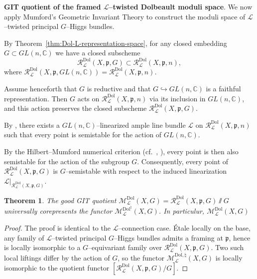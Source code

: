 \documentclass[12pt,reqno]{amsart}
\numberwithin{equation}{subsection}
\newtheorem{thm}[equation]{Theorem}
\theoremstyle{definition}
\theoremstyle{theorem}
\begin{document}
\medskip
\noindent \textbf{GIT quotient of the framed $\mathcal{L}$--twisted Dolbeault moduli space}.
We now apply Mumford's Geometric Invariant Theory to construct the
moduli space of $\mathcal{L}$--twisted principal $G$--Higgs bundles.

By Theorem~\ref{thm:Dol-L-representation-space}, for any closed embedding
$G \subset GL(n,\mathbb{C})$ we have a closed subscheme
\[
\mathcal{R}^{\mathrm{Dol}}_{\mathcal{L}}(X,\mathfrak{p},G)
\subset
\mathcal{R}^{\mathrm{Dol}}_{\mathcal{L}}(X,\mathfrak{p},n),
\]
where
$\mathcal{R}^{\mathrm{Dol}}_{\mathcal{L}}(X,\mathfrak{p},GL(n,\mathbb{C}))
= \mathcal{R}^{\mathrm{Dol}}_{\mathcal{L}}(X,\mathfrak{p},n)$.

Assume henceforth that $G$ is reductive and that
$G \hookrightarrow GL(n,\mathbb{C})$ is a faithful representation.
Then $G$ acts on
$\mathcal{R}^{\mathrm{Dol}}_{\mathcal{L}}(X,\mathfrak{p},n)$
via its inclusion in $GL(n,\mathbb{C})$, and this action preserves the
closed subscheme
$\mathcal{R}^{\mathrm{Dol}}_{\mathcal{L}}(X,\mathfrak{p},G)$.


By \cite[\S\,4, Th.~4.10]{CT.Simpson-1994}, there exists a
$GL(n,\mathbb{C})$--linearized ample line bundle
$\mathscr{L}$ on
$\mathcal{R}^{\mathrm{Dol}}_{\mathcal{L}}(X,\mathfrak{p},n)$
such that every point is semistable for the action of $GL(n,\mathbb{C})$.

By the Hilbert--Mumford numerical criterion
(cf.~\cite[\S\,Ch.~2, Th.~2.1]{D.Mumford-1965},
\cite[\S\,4, Th.~4.2.11]{Huybrechts-Lehn-2010}),
every point is then also semistable for the action of the subgroup $G$.
Consequently, every point of
$\mathcal{R}^{\mathrm{Dol}}_{\mathcal{L}}(X,\mathfrak{p},G)$
is $G$--semistable with respect to the induced linearization
$\mathscr{L}|_{\mathcal{R}^{\mathrm{Dol}}_{\mathcal{L}}(X,\mathfrak{p},G)}$.

\begin{thm}\label{thm:moduli-L-twisted-principal-G-Higgs}
	The good GIT quotient $
	\mathcal{M}^{\mathrm{Dol}}_{\mathcal{L}}(X,G)
	=
	\mathcal{R}^{\mathrm{Dol}}_{\mathcal{L}}(X,\mathfrak{p},G)
	\sslash G$ universally corepresents the functor $\mathcal{M}^{\mathrm{Dol}^{\natural}}_{\mathcal{L}}(X,G)$. In particulur, $\mathcal{M}^{\mathrm{Dol}}_{\mathcal{L}}(X,G)$ 
	
\end{thm}

\begin{proof}
	The proof is identical to the $\mathcal{L}$--connection case.
	Étale locally on the base, any family of $\mathcal{L}$--twisted principal
	$G$--Higgs bundles admits a framing at $\mathfrak{p}$, hence is locally
	isomorphic to a $G$--equivariant family over
	$\mathcal{R}^{\mathrm{Dol}}_{\mathcal{L}}(X,\mathfrak{p},G)$.
	Two such local liftings differ by the action of $G$, so the functor
	$\mathcal{M}^{\mathrm{Dol},\natural}_{\mathcal{L}}(X,G)$ is locally
	isomorphic to the quotient functor
	$[\mathcal{R}^{\mathrm{Dol}}_{\mathcal{L}}(X,\mathfrak{p},G)/G]$.
\end{proof}
\end{document}
